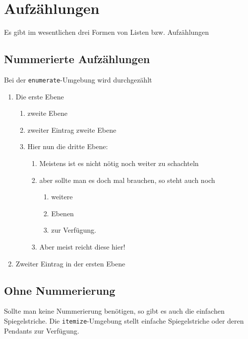 \section{Aufzählungen}

Es gibt im wesentlichen drei Formen von Listen bzw. Aufzählungen

\subsection{Nummerierte Aufzählungen}
Bei der \texttt{enumerate}-Umgebung wird durchgezählt
\begin{enumerate}
	\item Die erste Ebene
		\begin{enumerate}
			\item zweite Ebene

			\item zweiter Eintrag zweite Ebene

			\item Hier nun die dritte Ebene:
				\begin{enumerate}
					\item Meistens ist es nicht nötig noch weiter zu schachteln

					\item aber sollte man es doch mal brauchen, so steht auch noch
						\begin{enumerate}
							\item weitere

							\item Ebenen

							\item zur Verfügung.
						\end{enumerate}

					\item Aber meist reicht diese hier!
				\end{enumerate}
		\end{enumerate}

	\item Zweiter Eintrag in der ersten Ebene
\end{enumerate}

\subsection{Ohne Nummerierung}

Sollte man keine Nummerierung benötigen, so gibt es auch die einfachen Spiegelstriche.
Die \texttt{itemize}-Umgebung stellt einfache Spiegelstriche oder deren Pendants
zur Verfügung.

